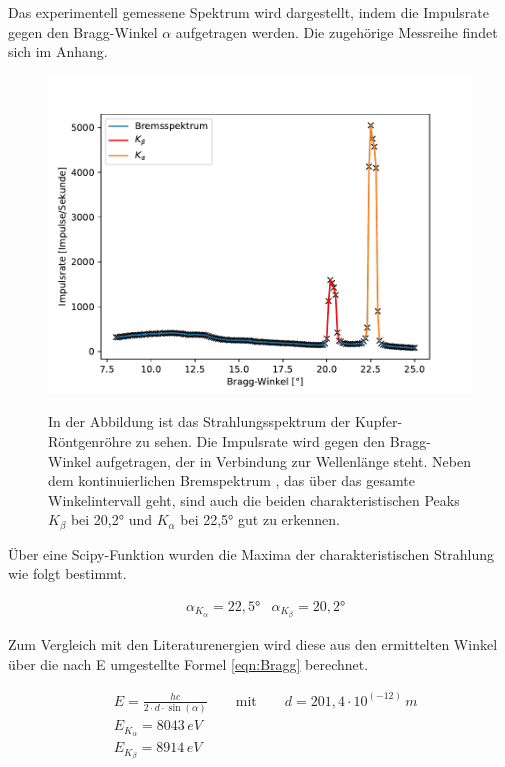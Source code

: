 \documentclass[titlepage = firstcover]{scrartcl}
\begin{document}
        \noindent
        Das experimentell gemessene Spektrum wird dargestellt, indem die Impulsrate gegen den Bragg-Winkel $\alpha$ aufgetragen werden. Die zugehörige 
        Messreihe findet sich im Anhang.
        
        \FloatBarrier
        \begin{figure}[h]
            \centering
            \caption{In der Abbildung ist das Strahlungsspektrum der Kupfer-Röntgenröhre zu sehen. Die Impulsrate wird gegen den Bragg-Winkel aufgetragen, der in Verbindung zur Wellenlänge steht. Neben dem kontinuierlichen Bremspektrum , das über das gesamte Winkelintervall geht, sind auch die beiden charakteristischen Peaks $K_{\beta}$ bei 20,2° und $K_{\alpha}$ bei 22,5° gut zu erkennen.}
            \includegraphics[width = 0.9\linewidth]{Spektrum_Cu.pdf}
            \label{fig:Spektrum}
        \end{figure}
        \FloatBarrier
        \noindent
        Über eine Scipy-Funktion wurden die Maxima der charakteristischen Strahlung wie folgt bestimmt.

        \begin{align}
            &\alpha_{K_{\alpha}} = 22,5°
            &\alpha_{K_{\beta}}  = 20,2°
        \end{align}

        \noindent
        Zum Vergleich mit den Literaturenergien wird diese aus den ermittelten Winkel über die nach E umgestellte Formel \ref{eqn:Bragg} berechnet.

        \begin{align}
            &E = \frac{hc}{2 \cdot d \cdot \sin(\alpha)} \qquad \text{mit} \qquad d=201,4\cdot 10^{\left(-12\right)} \, m \nonumber\\
            &E_{K_{\alpha}} = 8043 \, eV \\
            &E_{K_{\beta}}  = 8914 \, eV
            \label{eqn:EGraph}
        \end{align}
\end{document}
